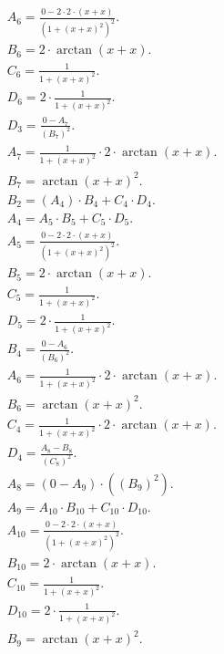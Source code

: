 \documentclass[12pt,a4paper]{extreport}
\begin{document}
\begin{multline}
\\
A_{6} = \frac{0 - 2 \cdot 2 \cdot (x + x)}{(1 + (x + x) ^ {2}) ^ {2}}.\\
B_{6} = 2 \cdot \arctan(x + x).\\
C_{6} = \frac{1}{1 + (x + x) ^ {2}}.\\
D_{6} = 2 \cdot \frac{1}{1 + (x + x) ^ {2}}.\\
D_{3} = \frac{0 - A_{7}}{(B_{7}) ^ {2}}.\\
A_{7} = \frac{1}{1 + (x + x) ^ {2}} \cdot 2 \cdot \arctan(x + x).\\
B_{7} = \arctan(x + x) ^ {2}.\\
B_{2} = (A_{4}) \cdot B_{4} + C_{4} \cdot D_{4}.\\
A_{4} = A_{5} \cdot B_{5} + C_{5} \cdot D_{5}.\\
A_{5} = \frac{0 - 2 \cdot 2 \cdot (x + x)}{(1 + (x + x) ^ {2}) ^ {2}}.\\
B_{5} = 2 \cdot \arctan(x + x).\\
C_{5} = \frac{1}{1 + (x + x) ^ {2}}.\\
D_{5} = 2 \cdot \frac{1}{1 + (x + x) ^ {2}}.\\
B_{4} = \frac{0 - A_{6}}{(B_{6}) ^ {2}}.\\
A_{6} = \frac{1}{1 + (x + x) ^ {2}} \cdot 2 \cdot \arctan(x + x).\\
B_{6} = \arctan(x + x) ^ {2}.\\
C_{4} = \frac{1}{1 + (x + x) ^ {2}} \cdot 2 \cdot \arctan(x + x).\\
D_{4} = \frac{A_{8} - B_{8}}{(C_{8}) ^ {2}}.\\
A_{8} = (0 - A_{9}) \cdot ((B_{9}) ^ {2}).\\
A_{9} = A_{10} \cdot B_{10} + C_{10} \cdot D_{10}.\\
A_{10} = \frac{0 - 2 \cdot 2 \cdot (x + x)}{(1 + (x + x) ^ {2}) ^ {2}}.\\
B_{10} = 2 \cdot \arctan(x + x).\\
C_{10} = \frac{1}{1 + (x + x) ^ {2}}.\\
D_{10} = 2 \cdot \frac{1}{1 + (x + x) ^ {2}}.\\
B_{9} = \arctan(x + x) ^ {2}.\\
\end{multline}
\end{document}
